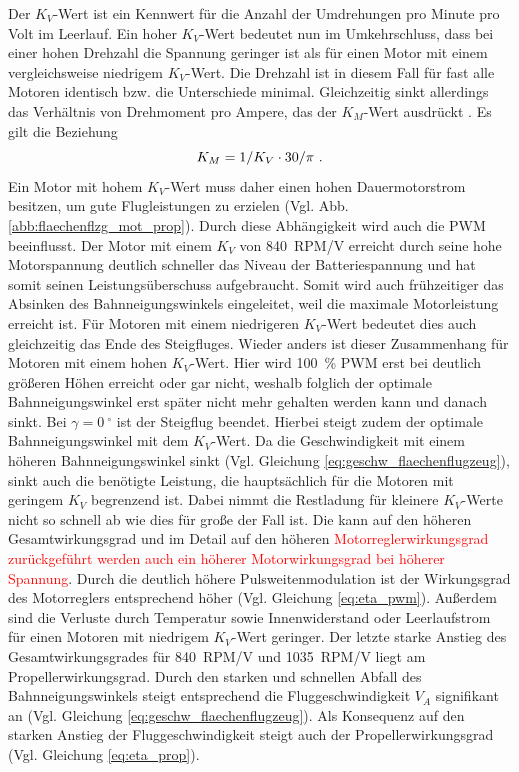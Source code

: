 Der \ensuremath{K_V}-Wert ist ein Kennwert für die Anzahl der Umdrehungen pro Minute pro Volt im Leerlauf. Ein hoher \ensuremath{K_V}-Wert bedeutet nun im Umkehrschluss, dass bei einer hohen Drehzahl die Spannung geringer ist als für einen Motor mit einem vergleichsweise niedrigem \ensuremath{K_V}-Wert. Die Drehzahl ist in diesem Fall für fast alle Motoren identisch bzw. die Unterschiede minimal. Gleichzeitig sinkt allerdings das Verhältnis von Drehmoment pro Ampere, das der \ensuremath{K_M}-Wert ausdrückt  \cite[S.35 und S.42-43]{Buchi.2013}. Es gilt die Beziehung
\begin{equation}
	K_M = 1/K_V\cdot 30/\pi ~\text{.}
\end{equation}
Ein Motor mit hohem \ensuremath{K_V}-Wert muss daher einen hohen Dauermotorstrom besitzen, um gute Flugleistungen zu erzielen (Vgl. Abb. \ref{abb:flaechenflzg_mot_prop}). Durch diese Abhängigkeit wird auch die PWM beeinflusst. Der Motor mit einem \ensuremath{K_V} von \SI{840}{RPM/V} erreicht durch seine hohe Motorspannung deutlich schneller das Niveau der Batteriespannung und hat somit seinen Leistungsüberschuss aufgebraucht. Somit wird auch frühzeitiger das Absinken des Bahnneigungswinkels eingeleitet, weil die maximale Motorleistung erreicht ist. Für Motoren mit einem niedrigeren \ensuremath{K_V}-Wert bedeutet dies auch gleichzeitig das Ende des Steigfluges. Wieder anders ist dieser Zusammenhang für Motoren mit einem hohen \ensuremath{K_V}-Wert. Hier wird \SI{100}{\%} PWM erst bei deutlich größeren Höhen erreicht oder gar nicht, weshalb folglich der optimale Bahnneigungswinkel erst später nicht mehr gehalten werden kann und danach sinkt. Bei \ensuremath{\gamma = \SI{0}{^\circ}} ist der Steigflug beendet. Hierbei steigt zudem der optimale Bahnneigungswinkel mit dem \ensuremath{K_V}-Wert. Da die Geschwindigkeit mit einem höheren Bahnneigungswinkel sinkt (Vgl. Gleichung \ref{eq:geschw_flaechenflugzeug}), sinkt auch die benötigte Leistung, die hauptsächlich für die Motoren mit geringem \ensuremath{K_V} begrenzend ist. Dabei nimmt die Restladung für kleinere \ensuremath{K_V}-Werte nicht so schnell ab wie dies für große der Fall ist. Die kann auf den höheren Gesamtwirkungsgrad und im Detail auf den höheren \textcolor{red}{Motorreglerwirkungsgrad zurückgeführt werden auch ein höherer Motorwirkungsgrad bei höherer Spannung}. Durch die deutlich höhere Pulsweitenmodulation ist der Wirkungsgrad des Motorreglers entsprechend höher (Vgl. Gleichung \ref{eq:eta_pwm}). Außerdem sind die Verluste durch Temperatur  sowie Innenwiderstand oder Leerlaufstrom für einen Motoren mit niedrigem \ensuremath{K_V}-Wert geringer. Der letzte starke Anstieg des Gesamtwirkungsgrades für \SI{840}{RPM/V} und \SI{1035}{RPM/V} liegt am Propellerwirkungsgrad. Durch den starken und schnellen Abfall des Bahnneigungswinkels steigt entsprechend die Fluggeschwindigkeit \ensuremath{V_A} signifikant an (Vgl. Gleichung \ref{eq:geschw_flaechenflugzeug}). Als Konsequenz auf den starken Anstieg der Fluggeschwindigkeit steigt auch der Propellerwirkungsgrad (Vgl. Gleichung \ref{eq:eta_prop}). \\
